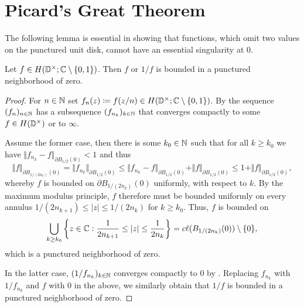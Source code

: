 \section{Picard's Great Theorem}
\label{sec:picards-great-theorem}


The following lemma is essential in showing that functions, which omit two values on the punctured unit disk, cannot have an essential singularity at $0$.

\begin{lemma} \label{lem:great-picard-bounded}
    Let $f \in H(\mathbb{D}^\times; \mathbb{C} \setminus \{ 0, 1 \})$. Then $f$ or $1/f$ is bounded in a punctured neighborhood of zero.
\end{lemma}

\begin{proof}
    For $n \in \mathbb{N}$ set $f_n(z) \coloneqq f(z / n) \in H(\mathbb{D}^\times; \mathbb{C} \setminus \{ 0, 1 \})$. By  the sequence $(f_n)_{n \in \mathbb{N}}$ has a subsequence $(f_{n_k})_{k \in \mathbb{N}}$ that converges compactly to some $f \in H(\mathbb{D}^\times)$ or to $\infty$.

    Assume the former case, then there is some $k_0 \in \mathbb{N}$ such that for all $k \geq k_0$ we have $ \Vert f_{n_k} - f \Vert_{\partial B_{1/2}(0)} < 1 $ and thus
    \begin{equation*}
        \Vert f \Vert_{\partial B_{1/(2n_k)}(0)} = \Vert f_{n_k} \Vert_{\partial B_{1/2}(0)} \leq \Vert f_{n_k} - f \Vert_{\partial B_{1/2}(0)} + \Vert f \Vert_{\partial B_{1/2}(0)} \leq 1 + \Vert f \Vert_{\partial B_{1/2}(0)},
    \end{equation*}
    whereby $f$ is bounded on $\partial B_{1/(2n_k)}(0)$ uniformly, with respect to $k$. By the maximum modulus principle, $f$ therefore must be bounded uniformly on every annulus $1 / (2 n_{k + 1}) \leq \vert z \vert \leq 1 / (2 n_k)$ for $k \geq k_0$. Thus, $f$ is bounded on
    $$ \bigcup_{k \geq k_0} \left\{ z \in \mathbb{C} : \frac{1}{2 n_{k+1}} \leq \vert z \vert \leq \frac{1}{2 n_k} \right\} = c\ell({B_{1/(2n_k)}(0)}) \setminus \{ 0 \}, $$
    which is a punctured neighborhood of zero.

    In the latter case, $(1 / f_{n_k})_{k \in \mathbb{N}}$ converges compactly to $0$ by . Replacing $f_{n_k}$ with $1 / f_{n_k}$ and $f$ with $0$ in the above, we similarly obtain that $1 / f$ is bounded in a punctured neighborhood of zero.
\end{proof}

